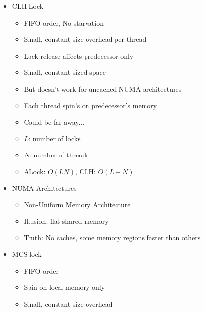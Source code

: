 \documentclass[12pt]{article}
\begin{document}
{\begin{itemize}
\begin{itemize}
\begin{itemize}
			\item Space hog, One bit per thread
		\end{itemize}
		\item CLH Lock
		\begin{itemize}
			\item FIFO order, No starvation
			\item Small, constant size overhead per thread
			\item Lock release affects predecessor only
			\item Small, constant sized space
			\item But doesn't work for uncached NUMA architectures
			\item Each thread spin's on predecessor's memory
			\item Could be far away...
		\end{itemize}
		\begin{itemize}
			\item $L$: number of locks
			\item $N$: number of threads
			\item ALock: $O(LN)$, CLH: $O(L+N)$ 		
		\end{itemize}
		\item NUMA Architectures
		\begin{itemize}
			\item Non-Uniform Memory Architecture
			\item Illusion: flat shared memory
			\item Truth: No caches, some memory regions faster than others
		\end{itemize}
		\item MCS lock
		\begin{itemize}
			\item FIFO order
			\item Spin on local memory only
			\item Small, constant size overhead
		\end{itemize}
	\end{itemize}
	
\end{itemize}

}
\end{document}
